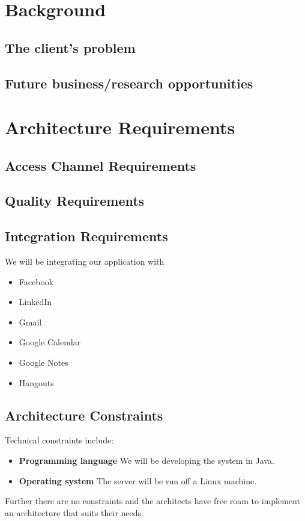 \documentclass[hidelinks,english]{article}
\begin{document}
	\section{Background}
		\subsection{The client's problem}
		
		
		\subsection{Future business/research opportunities}
	
	
	\section{Architecture Requirements}
	
		
		
		\subsection{Access Channel Requirements}
		
		
		\subsection{Quality Requirements}
		
		
		\subsection{Integration Requirements}
		We will be integrating our application with
		\begin{itemize}
			\item Facebook
			\item LinkedIn
			\item Gmail
			\item Google Calendar
			\item Google Notes
			\item Hangouts
		\end{itemize}
		
		\subsection{Architecture Constraints}
			Technical constraints include:
			\begin{itemize}
				\item \textbf{Programming language} We will be developing the system in Java.
				\item \textbf{Operating system} The server will be run off a Linux machine. 
			\end{itemize}
			Further there are no constraints and the architects have free roam to implement an architecture that suits their needs.
	
\end{document}
